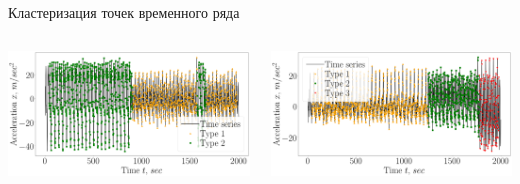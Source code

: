 \documentclass[10pt,pdf,hyperref={unicode}]{beamer}
\begin{document}
\begin{frame}[shrink=5]{Кластеризация точек временного ряда}
\justifying

\begin{columns}
    \begin{column}{0.5\textwidth}
        \includegraphics[width=1\textwidth]{results/2_patern_2_claster_vector}
    \end{column}
    \begin{column}{0.5\textwidth}
        \includegraphics[width=1\textwidth]{results/3_patern_2_claster_vector}
    \end{column}
\end{columns}


\end{frame}
\end{document}
